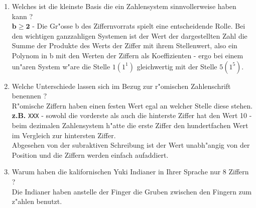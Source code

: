 \documentclass[a4paper,10pt]{article}
\begin{document}
\begin{enumerate}
\item Welches ist die kleinste Basis die ein Zahlensystem sinnvollerweise haben kann ? \\
	 {\color{ForestGreen}
	 	$\mathbf{b \geq 2}$ - Die Gr"osse b des Ziffernvorrats spielt eine entscheidende Rolle. Bei den wichtigen ganzzahligen Systemen ist der Wert der dargestellten Zahl die Summe der Produkte des Werts der Ziffer mit ihrem Stellenwert, 
	 	also ein Polynom in b mit den Werten der Ziffern als Koeffizienten - ergo bei einem un"aren System w"are die Stelle $1 (1^1)$ gleichwertig mit der Stelle $5 (1^5)$.
	}
\item Welche Unterschiede lassen sich im Bezug zur r"omischen Zahlenschrift benennen ? \\
	 {\color{ForestGreen}
		R"omische Ziffern haben einen festen Wert egal an welcher Stelle diese stehen.
		\\
		\textbf{z.B.} \verb|XXX| - sowohl die vorderste als auch die hinterste Ziffer hat den Wert 10 - beim dezimalen Zahlensystem h"atte die erste Ziffer den hundertfachen Wert im Vergleich zur hintersten Ziffer.
		\\
		Abgesehen von der subraktiven Schreibung ist der Wert unabh"angig von der Position und die Ziffern werden einfach aufaddiert.
	}
\item Warum haben die kalifornischen Yuki Indianer in Ihrer Sprache nur 8 Ziffern ? \\
	 {\color{ForestGreen}
		Die Indianer haben anstelle der Finger die Gruben zwischen den Fingern zum z"ahlen benutzt.
	}
\end{enumerate}
\end{document}
